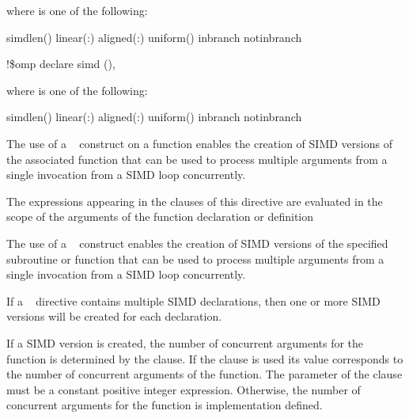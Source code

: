 where  is one of the following:

\begin{indentedcodelist}
simdlen()
linear(\plc{linear-list[ }:\plc{ constant-linear-step]})
aligned(\plc{argument-list[ }:\plc{ alignment]})
uniform()
inbranch
notinbranch
\end{indentedcodelist}
\ccppspecificend


\fortranspecificstart
\begin{boxedcode}
!\$omp declare simd \plc{[}()\plc{] [clause[ [},\plc{] clause] ... ]}
\end{boxedcode}

where  is one of the following:
\begin{indentedcodelist}
simdlen()
linear(\plc{linear-list[ }:\plc{ constant-linear-step]})
aligned(\plc{argument-list[ }:\plc{ alignment]})
uniform()
inbranch
notinbranch
\end{indentedcodelist}
\fortranspecificend


\descr
\ccppspecificstart
The use of a ~ construct on a function enables the creation of SIMD 
versions of the associated function that can be used to process multiple arguments from 
a single invocation from a SIMD loop concurrently.

The expressions appearing in the clauses of this directive are evaluated in the scope of 
the arguments of the function declaration or definition
\ccppspecificend

\begin{samepage}
\fortranspecificstart
The use of a ~ construct enables the creation of SIMD versions of the 
specified subroutine or function that can be used to process multiple arguments from a 
single invocation from a SIMD loop concurrently. 
\fortranspecificend
\end{samepage}

If a ~ directive contains multiple SIMD declarations, then one or more 
SIMD versions will be created for each declaration.

If a SIMD version is created, the number of concurrent arguments for the function is 
determined by the  clause. If the  clause is used its value 
corresponds to the number of concurrent arguments of the function. The parameter of 
the  clause must be a constant positive integer expression. Otherwise, the 
number of concurrent arguments for the function is implementation defined.

